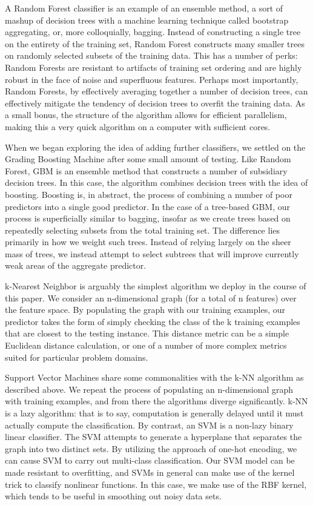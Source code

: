 A Random Forest classifier\cite{breiman2001random} is an example of an 
ensemble method, a sort of mashup of decision trees with a machine 
learning technique called bootstrap aggregating, or, more colloquially, 
bagging\cite{bagging}.  Instead of constructing a single tree on the 
entirety of the training set, Random Forest constructs many smaller 
trees on randomly selected subsets of the training data.  This has a 
number of perks: Random Forests are resistant to artifacts of training 
set ordering and are highly robust in the face of noise and superfluous 
features.  Perhaps most importantly, Random Forests, by effectively 
averaging together a number of decision trees, can effectively mitigate 
the tendency of decision trees to overfit the training data.  As a 
small bonus, the structure of the algorithm allows for efficient 
parallelism, making this a very quick algorithm on a computer with 
sufficient cores.

When we began exploring the idea of adding further classifiers, we 
settled on the Grading Boosting Machine\cite{gbm} after some small 
amount of testing.  Like Random Forest, GBM is an ensemble method that 
constructs a number of subsidiary decision trees.  In this case, the 
algorithm combines decision trees with the idea of 
boosting\cite{boosting}.  Boosting is, in abstract, the process of 
combining a number of poor predictors into a single good predictor.  
In the case of a tree-based GBM, our process is superficially similar 
to bagging, insofar as we create trees based on repeatedly selecting 
subsets from the total training set.  The difference lies primarily in 
how we weight such trees.  Instead of relying largely on the sheer mass 
of trees, we instead attempt to select subtrees that will improve 
currently weak areas of the aggregate predictor.

k-Nearest Neighbor\cite{nearest} is arguably the simplest algorithm we 
deploy in the course of this paper.  We consider an n-dimensional 
graph (for a total of n features) over the feature space.  By populating 
the graph with our training examples, our predictor takes the form of 
simply checking the class of the k training examples that are closest 
to the testing instance.  This distance metric can be a simple 
Euclidean distance calculation, or one of a number of more complex 
metrics suited for particular problem domains.

Support Vector Machines\cite{support} share some commonalities with 
the k-NN algorithm as described above.  We repeat the process of 
populating an n-dimensional graph with training examples, and from 
there the algorithms diverge significantly.  k-NN is a lazy algorithm: 
that is to say, computation is generally delayed until it must actually 
compute the classification.  By contrast, an SVM is a non-lazy binary 
linear classifier.  The SVM attempts to generate a hyperplane that 
separates the graph into two distinct sets.  By utilizing the approach 
of one-hot encoding, we can cause SVM to carry out multi-class 
classification.  Our SVM model can be made resistant to overfitting, 
and SVMs in general can make use of the kernel trick to classify 
nonlinear functions.  In this case, we make use of the RBF\cite{rbf} 
kernel, which tends to be useful in smoothing out noisy data sets. 


